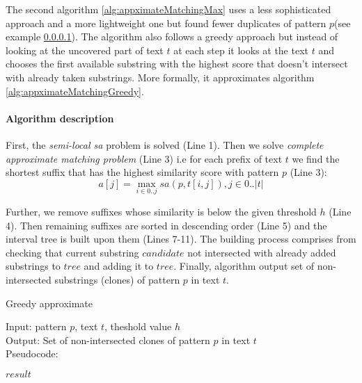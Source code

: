 The second algorithm \ref{alg:appximateMatchingMax} uses a less sophisticated approach and a more lightweight one but found fewer duplicates of pattern $p$(see example \ref{}).
The algorithm also follows a greedy approach but instead of looking at the uncovered part of text $t$ at each step it looks at the text $t$ and chooses the first available substring with the highest score that doesn't intersect with already taken substrings.
More formally, it approximates algorithm \ref{alg:appximateMatchingGreedy}.

\paragraph{Algorithm description}
First, the \emph{semi-local sa} problem is solved (Line 1).
Then we solve \emph{complete approximate matching problem} (Line 3) i.e
for each prefix of text $t$ we find the shortest suffix that has the highest similarity score with pattern $p$ (Line 3):
\begin{equation}
    a[j] = \max _{i \in 0 ..j} sa(p,t[i,j]), j \in 0..|t|
\end{equation}

Further, we remove suffixes whose similarity is below the given threshold $h$ (Line 4).
Then remaining suffixes are sorted in descending order (Line 5) and the interval tree is built upon them (Lines 7-11).
The building process comprises from checking that current substring $candidate$ not intersected with already added substrings to $tree$ and adding it to $tree$.
Finally, algorithm output set of non-intersected substrings (clones) of pattern $p$ in text $t$.


\begin{algorithm}[H]
\caption{Greedy approximate}
\label{alg:appximateMatchingMax}
Input: pattern $p$, text $t$, theshold value $h$\\
Output: Set of non-intersected clones of pattern $p$ in text $t$\\
Pseudocode:
\begin{algorithmic}[1]

\ENDIF
\ENDFOR
{}
\RETURN $result$
\end{algorithmic}
\end{algorithm}

